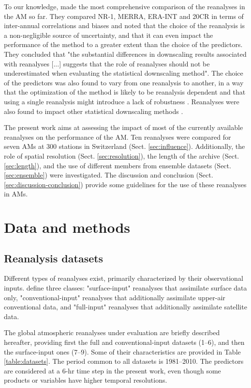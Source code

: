 \documentclass[smallextended]{svjour3}       %
\begin{document}
	To our knowledge, \citet{Dayon2015} made the most comprehensive comparison of the reanalyses in the AM so far. They compared NR-1, MERRA, ERA-INT and 20CR in terms of inter-annual correlations and biases and noted that the choice of the reanalysis is a non-negligible source of uncertainty, and that it can even impact the performance of the method to a greater extent than the choice of the predictors. They concluded that "the substantial differences in downscaling results associated with reanalyses [...] suggests that the role of reanalyses should not be underestimated when evaluating the statistical downscaling method". The choice of the predictors was also found to vary from one reanalysis to another, in a way that the optimization of the method is likely to be reanalysis dependent and that using a single reanalysis might introduce a lack of robustness \citep{Dayon2015}. Reanalyses were also found to impact other statistical downscaling methods \citep[e.g.][]{Koukidis2009}.
	
	The present work aims at assessing the impact of most of the currently available reanalyses on the performance of the AM. Ten reanalyses were compared for seven AMs at 300 stations in Switzerland (Sect. \ref{sec:influence}). Additionally, the role of spatial resolution (Sect. \ref{sec:resolution}), the length of the archive (Sect. \ref{sec:length}), and the use of different members from ensemble datasets (Sect. \ref{sec:ensemble}) were investigated. The discussion and conclusion (Sect. \ref{sec:discussion-conclusion}) provide some guidelines for the use of these reanalyses in AMs.
	
	
	\section{Data and methods}
	\label{sec:data}
	
	\subsection{Reanalysis datasets}
	
	Different types of reanalyses exist, primarily characterized by their observational inputs. \citet{Fujiwara2017} define three classes: "surface-input" reanalyses that assimilate surface data only, "conventional-input" reanalyses that additionally assimilate upper-air conventional data, and "full-input" reanalyses that additionally assimilate satellite data.
	
	The global atmospheric reanalyses under evaluation are briefly described hereafter, providing first the full and conventional-input datasets (1--6), and then the surface-input ones (7--9). Some of their characteristics are provided in Table \ref{table:datasets}. The period common to all datasets is 1981--2010. The predictors are considered at a 6-hr time step in the present work, even though some products or variables have higher temporal resolutions.
	
\end{document}

